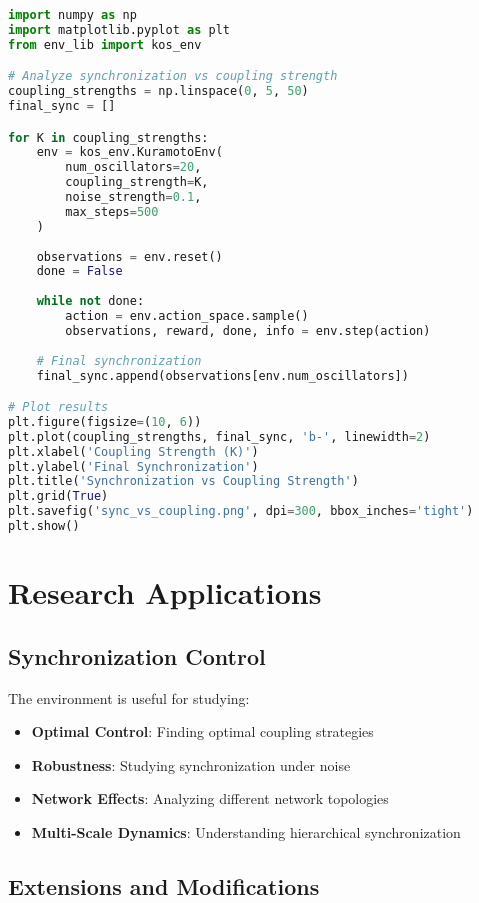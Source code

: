 \begin{lstlisting}[language=python, caption=Parameter Analysis]
import numpy as np
import matplotlib.pyplot as plt
from env_lib import kos_env

# Analyze synchronization vs coupling strength
coupling_strengths = np.linspace(0, 5, 50)
final_sync = []

for K in coupling_strengths:
    env = kos_env.KuramotoEnv(
        num_oscillators=20,
        coupling_strength=K,
        noise_strength=0.1,
        max_steps=500
    )
    
    observations = env.reset()
    done = False
    
    while not done:
        action = env.action_space.sample()
        observations, reward, done, info = env.step(action)
    
    # Final synchronization
    final_sync.append(observations[env.num_oscillators])

# Plot results
plt.figure(figsize=(10, 6))
plt.plot(coupling_strengths, final_sync, 'b-', linewidth=2)
plt.xlabel('Coupling Strength (K)')
plt.ylabel('Final Synchronization')
plt.title('Synchronization vs Coupling Strength')
plt.grid(True)
plt.savefig('sync_vs_coupling.png', dpi=300, bbox_inches='tight')
plt.show()
\end{lstlisting}

\section{Research Applications}

\subsection{Synchronization Control}

The environment is useful for studying:
\begin{itemize}
    \item \textbf{Optimal Control}: Finding optimal coupling strategies
    \item \textbf{Robustness}: Studying synchronization under noise
    \item \textbf{Network Effects}: Analyzing different network topologies
    \item \textbf{Multi-Scale Dynamics}: Understanding hierarchical synchronization
\end{itemize}

\subsection{Extensions and Modifications}

